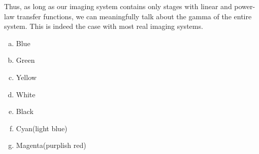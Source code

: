 Thus, as long as our imaging system contains only stages with linear
and power-law transfer functions, we can meaningfully talk about the
gamma of the entire system. This is indeed the case with most real
imaging systems.

\begin{Answer}[ref={rgb-triplet}]
  \begin{enumerate}[(a)]
  \item Blue
  \item Green
  \item Yellow
  \item White
  \item Black
  \item Cyan(light blue)
  \item Magenta(purplish red)
  \end{enumerate}
\end{Answer}


